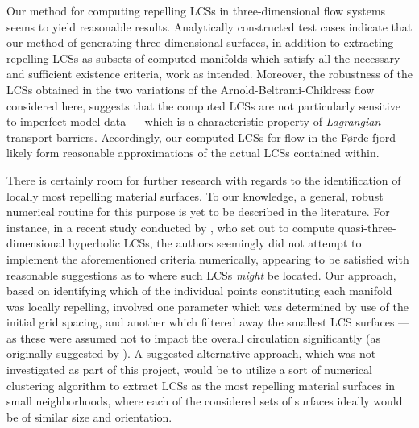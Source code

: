 Our method for computing repelling LCSs in three-dimensional flow systems
seems to yield reasonable results. Analytically constructed test cases indicate
that our method of generating three-dimensional surfaces, in addition to
extracting repelling LCSs as subsets of computed manifolds which satisfy all
the necessary and sufficient existence criteria, work as intended. Moreover,
the robustness of the LCSs obtained in the two variations of the
Arnold-Beltrami-Childress flow considered here, suggests that the computed LCSs
are not particularly sensitive to imperfect model data --- which is a
characteristic property of \emph{Lagrangian} transport barriers. Accordingly,
our computed LCSs for flow in the Førde fjord likely form reasonable
approximations of the actual LCSs contained within.

There is certainly room for further research with regards to the identification
of locally most repelling material surfaces. To our knowledge, a general,
robust numerical routine for this purpose is yet to be described in the
literature. For instance, in a recent study conducted by
\textcite{oettinger2016autonomous}, who set out to compute
quasi-three-dimensional hyperbolic LCSs, the authors seemingly did not attempt
to implement the aforementioned criteria numerically, appearing to be satisfied
with reasonable suggestions as to where such LCSs \emph{might} be located. Our
approach, based on identifying which of the individual points constituting each
manifold was locally repelling, involved one parameter which was determined by
use of the  initial grid spacing, and another which filtered away the smallest
LCS  surfaces --- as these were assumed not to impact the overall circulation
significantly (as originally suggested by \textcite{farazmand2012computing}).
A suggested alternative approach, which was not investigated as part of this
project, would be to utilize a sort of numerical clustering algorithm to
extract LCSs as the most repelling material surfaces in small neighborhoods,
where each of the considered sets of surfaces ideally would be of similar size
and orientation.

